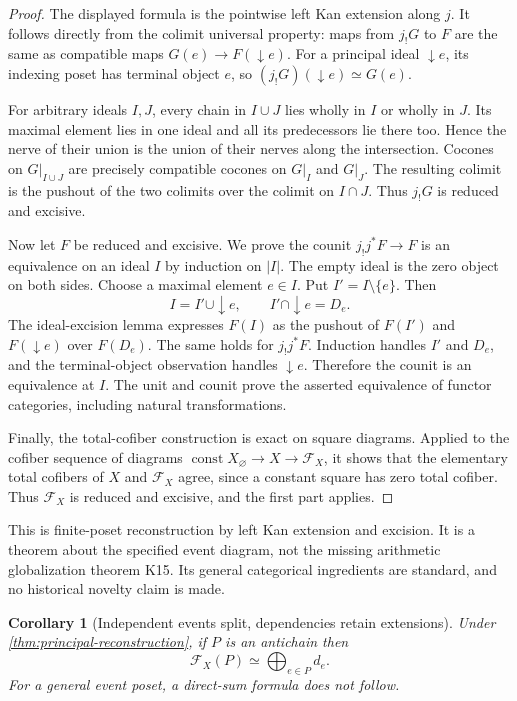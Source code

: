 \documentclass[11pt]{article}
\newtheorem{corollary}[theorem]{Corollary}
\theoremstyle{definition}
\theoremstyle{remark}
\begin{document}
\begin{proof}
The displayed formula is the pointwise left Kan extension along $j$. It follows directly from the colimit universal property: maps from $j_!G$ to $F$ are the same as compatible maps $G(e)\to F(\downarrow e)$. For a principal ideal $\downarrow e$, its indexing poset has terminal object $e$, so $(j_!G)(\downarrow e)\simeq G(e)$.

For arbitrary ideals $I,J$, every chain in $I\cup J$ lies wholly in $I$ or wholly in $J$. Its maximal element lies in one ideal and all its predecessors lie there too. Hence the nerve of their union is the union of their nerves along the intersection. Cocones on $G|_{I\cup J}$ are precisely compatible cocones on $G|_I$ and $G|_J$. The resulting colimit is the pushout of the two colimits over the colimit on $I\cap J$. Thus $j_!G$ is reduced and excisive.

Now let $F$ be reduced and excisive. We prove the counit $j_!j^*F\to F$ is an equivalence on an ideal $I$ by induction on $|I|$. The empty ideal is the zero object on both sides. Choose a maximal element $e\in I$. Put $I'=I\setminus\{e\}$. Then
\[
 I=I'\cup\downarrow e,\qquad I'\cap\downarrow e=D_e.
\]
The ideal-excision lemma expresses $F(I)$ as the pushout of $F(I')$ and $F(\downarrow e)$ over $F(D_e)$. The same holds for $j_!j^*F$. Induction handles $I'$ and $D_e$, and the terminal-object observation handles $\downarrow e$. Therefore the counit is an equivalence at $I$. The unit and counit prove the asserted equivalence of functor categories, including natural transformations.

Finally, the total-cofiber construction is exact on square diagrams. Applied to the cofiber sequence of diagrams $\operatorname{const}X_{\varnothing}\to X\to\mathcal F_X$, it shows that the elementary total cofibers of $X$ and $\mathcal F_X$ agree, since a constant square has zero total cofiber. Thus $\mathcal F_X$ is reduced and excisive, and the first part applies.
\end{proof}

This is finite-poset reconstruction by left Kan extension and excision. It is a theorem about the specified event diagram, not the missing arithmetic globalization theorem K15. Its general categorical ingredients are standard, and no historical novelty claim is made.

\begin{corollary}[Independent events split, dependencies retain extensions]\label{cor:independent-splitting}
Under \cref{thm:principal-reconstruction}, if $P$ is an antichain then
\[
 \mathcal F_X(P)\simeq\bigoplus_{e\in P}d_e.
\]
For a general event poset, a direct-sum formula does not follow.
\end{corollary}
\end{document}
